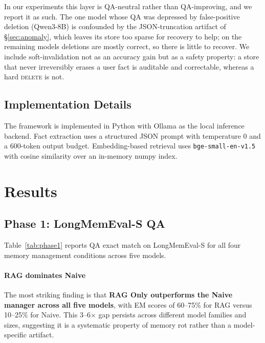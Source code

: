 \documentclass[10pt, twocolumn]{article}
\begin{document}
In our experiments this layer is QA-neutral rather than QA-improving, and we
report it as such. The one model whose QA was depressed by false-positive
deletion (Qwen3-8B) is confounded by the JSON-truncation artifact of
\S\ref{sec:anomaly}, which leaves its store too sparse for recovery to help;
on the remaining models deletions are mostly correct, so there is little to
recover. We include soft-invalidation not as an accuracy gain but as a safety
property: a store that never irreversibly erases a user fact is auditable and
correctable, whereas a hard \textsc{delete} is not.

\subsection{Implementation Details}

The framework is implemented in Python with Ollama as the local inference
backend.
Fact extraction uses a structured JSON prompt with temperature 0 and a
600-token output budget.
Embedding-based retrieval uses \texttt{bge-small-en-v1.5} with cosine
similarity over an in-memory numpy index.

\section{Results}
\label{sec:results}

\subsection{Phase 1: LongMemEval-S QA}
\label{sec:phase1}

Table~\ref{tab:phase1} reports QA exact match on LongMemEval-S for all
four memory management conditions across five models.

\paragraph{RAG dominates Naive}
The most striking finding is that \textbf{RAG Only outperforms the Naive
manager across all five models}, with EM scores of 60--75\% for RAG versus
10--25\% for Naive.
This 3--6$\times$ gap persists across different model families and sizes,
suggesting it is a systematic property of memory rot rather than a
model-specific artifact.
\end{document}
